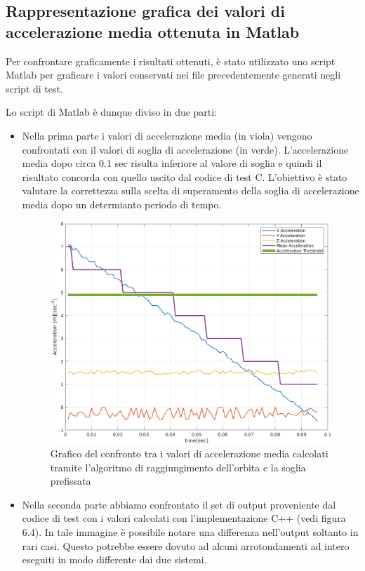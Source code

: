 \documentclass[LaM,binding=0.6cm]{../sapthesis}
\begin{document}
\newpage
\subsection{Rappresentazione grafica dei valori di accelerazione media ottenuta in Matlab}

Per confrontare graficamente i risultati ottenuti, è stato utilizzato uno script Matlab per graficare i valori conservati nei file precedentemente generati negli script di test.

Lo script di Matlab è dunque diviso in due parti:
\begin{itemize} 
\item Nella prima parte i valori di accelerazione media (in viola) vengono confrontati con il valori di soglia di accelerazione (in verde). L'accelerazione media dopo circa 0.1 sec risulta inferiore al valore di soglia e quindi il risultato concorda con quello uscito dal codice di test C. L'obiettivo è stato valutare la correttezza sulla scelta di superamento della soglia di accelerazione media dopo un determianto periodo di tempo.
    
    \begin{figure}[htbp]
    \centerline{\includegraphics[scale=0.6]{examples/MeanAcceleration.png}}
    \caption{Grafico del confronto tra i valori di accelerazione media calcolati tramite l'algoritmo di raggiungimento dell'orbita e la soglia prefissata}
    \label{fig}
    \end{figure}
\newpage
    \item Nella seconda parte abbiamo confrontato il set di output proveniente dal codice di test con i valori calcolati con l'implementazione C++ (vedi figura 6.4). In tale immagine è possibile notare una differenza nell'output soltanto in rari casi. Questo potrebbe essere dovuto ad alcuni arrotondamenti ad intero eseguiti in modo differente dai due sistemi.


\end{itemize}
\end{document}
